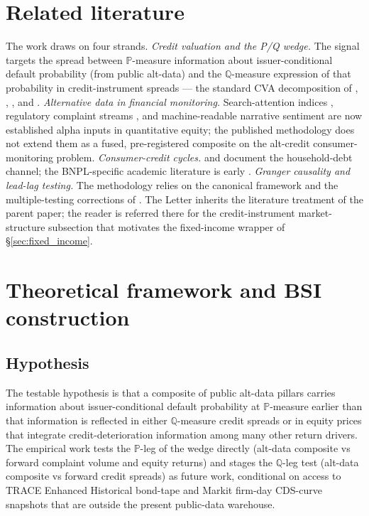 \documentclass[11pt,a4paper]{article}
\begin{document}
\section{Related literature}\label{sec:litreview}

The work draws on four strands. \textit{Credit valuation and the P/Q wedge.} The signal targets the spread between $\mathbb{P}$-measure information about issuer-conditional default probability (from public alt-data) and the $\mathbb{Q}$-measure expression of that probability in credit-instrument spreads --- the standard CVA decomposition of \citet{basel2011cva}, \citet{brigomorinipallavicini2013}, \citet{burgardkjaer2013funding}, and \citet{hullwhite2012fva}. \textit{Alternative data in financial monitoring.} Search-attention indices \citep{daengelberggao2011searchattention}, regulatory complaint streams \citep{cfpb2022bnplmarket,cfpb2023api}, and machine-readable narrative sentiment \citep{araci2019finbert} are now established alpha inputs in quantitative equity; the published methodology does not extend them as a fused, pre-registered composite on the alt-credit consumer-monitoring problem. \textit{Consumer-credit cycles.} \citet{adelinoschoar2016} and \citet{mianrampinisufi2017} document the household-debt channel; the BNPL-specific academic literature is early \citep{difilippo2018marketplace,beck2024bnpl}. \textit{Granger causality and lead-lag testing.} The methodology relies on the canonical \citet{granger1969investigating} framework and the multiple-testing corrections of \citet{bh1995}. The Letter inherits the literature treatment of the parent paper; the reader is referred there for the credit-instrument market-structure subsection that motivates the fixed-income wrapper of §\ref{sec:fixed_income}.

\section{Theoretical framework and BSI construction}\label{sec:theory}

\subsection*{Hypothesis} The testable hypothesis is that a composite of public alt-data pillars carries information about issuer-conditional default probability at $\mathbb{P}$-measure earlier than that information is reflected in either $\mathbb{Q}$-measure credit spreads or in equity prices that integrate credit-deterioration information among many other return drivers. The empirical work tests the $\mathbb{P}$-leg of the wedge directly (alt-data composite vs forward complaint volume and equity returns) and stages the $\mathbb{Q}$-leg test (alt-data composite vs forward credit spreads) as future work, conditional on access to TRACE Enhanced Historical bond-tape and Markit firm-day CDS-curve snapshots that are outside the present public-data warehouse.
\end{document}

